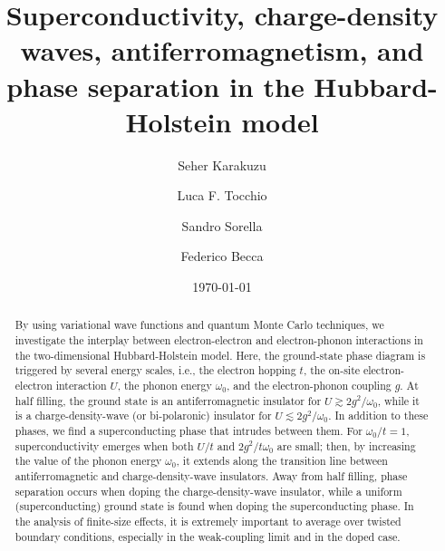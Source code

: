 \documentclass[aps,superscriptaddress,amsmath,amssymb,twocolumn,showpacs,floatfix,english]{revtex4}
\begin{document}
\title{Superconductivity, charge-density waves, antiferromagnetism, and phase separation in the Hubbard-Holstein model}

\author{Seher Karakuzu}
\author{Luca F. Tocchio}
\author{Sandro Sorella}
\author{Federico Becca}
\date{\today}

\begin{abstract}
By using variational wave functions and quantum Monte Carlo techniques, we investigate the interplay between electron-electron and 
electron-phonon interactions in the two-dimensional Hubbard-Holstein model. Here, the ground-state phase diagram is triggered by 
several energy scales, i.e., the electron hopping $t$, the on-site electron-electron interaction $U$, the phonon energy $\omega_0$, 
and the electron-phonon coupling $g$. At half filling, the ground state is an antiferromagnetic insulator for $U \gtrsim 2g^2/\omega_0$, 
while it is a charge-density-wave (or bi-polaronic) insulator for $U \lesssim 2g^2/\omega_0$. In addition to these phases, we find a 
superconducting phase that intrudes between them. For $\omega_0/t=1$, superconductivity emerges when both $U/t$ and $2g^2/t\omega_0$ 
are small; then, by increasing the value of the phonon energy $\omega_0$, it extends along the transition line between antiferromagnetic 
and charge-density-wave insulators. Away from half filling, phase separation occurs when doping the charge-density-wave insulator, while 
a uniform (superconducting) ground state is found when doping the superconducting phase. In the analysis of finite-size effects, it 
is extremely important to average over twisted boundary conditions, especially in the weak-coupling limit and in the doped case.
\end{abstract}


\maketitle
\end{document}
